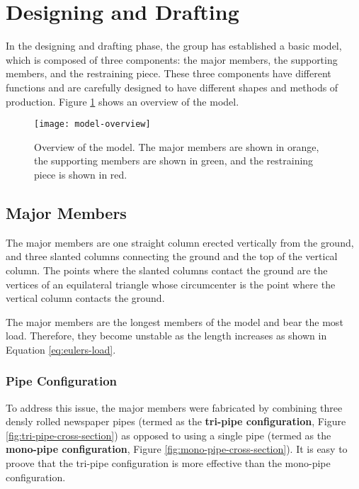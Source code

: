 \documentclass[fleqn,10pt]{SelfArx} %
\begin{document}



\section{Designing and Drafting}

In the designing and drafting phase, the group has established a basic model, which is
	composed of three components: the major members, the supporting members, and the
	restraining piece. These three components have different functions and are carefully
	designed to have different shapes and methods of production. Figure \ref{fig:model-overview}
	shows an overview of the model.

	\begin{figure}[hbt]
		\centering
		\texttt{[image: model-overview]}
		\caption{Overview of the model. The major members are shown in orange, the
			supporting members are shown in green, and the restraining piece is shown in red.}
		\label{fig:model-overview}
	\end{figure}

\subsection{Major Members}

The major members are one straight column erected vertically from the ground, and three
	slanted columns connecting the ground and the top of the vertical column. The points
	where the slanted columns contact the ground are the vertices of an equilateral triangle
	whose circumcenter is the point where the vertical column contacts the ground.

The major members are the longest members of the model and bear the most load. Therefore,
	they become unstable as the length increases as shown in Equation \ref{eq:eulers-load}.

\subsubsection{Pipe Configuration}

To address this issue, the major members were fabricated by combining three densly rolled
	newspaper pipes (termed as the \textbf{tri-pipe configuration}, Figure
	\ref{fig:tri-pipe-cross-section}) as opposed to using
	a single pipe (termed as the \textbf{mono-pipe configuration}, Figure
	\ref{fig:mono-pipe-cross-section}). It is easy to proove
	that the tri-pipe configuration is more effective than the mono-pipe configuration.
\end{document}
